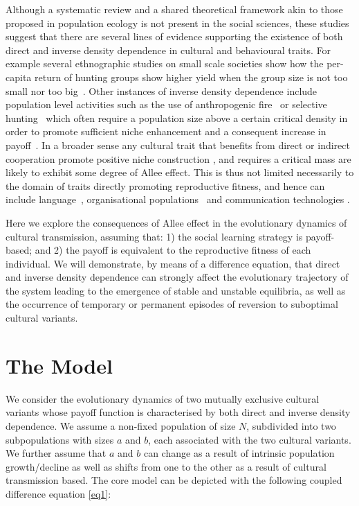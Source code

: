 \documentclass[3p,authoryear,twocolumn]{elsarticle} %
\begin{document}
Although a systematic review and a shared theoretical framework akin to those proposed in population ecology \citep{kramer_etal_2009} is not present in the social sciences, these studies suggest that there are several lines of evidence supporting the existence of both direct and inverse density dependence in cultural and behavioural traits. For example several ethnographic studies on small scale societies show how the per-capita return of hunting groups show higher yield when the group size is not too small nor too big~\citep{hill_and_hawkes_1983,janssen_and_hill_2014}. Other instances of inverse density dependence include population level activities such as the use of anthropogenic fire~\citep{bird2013} or selective hunting~\citep{dods_2002} which often require a population size above a certain critical density in order to promote sufficient niche enhancement and a consequent increase in payoff~\citep{rowley-conwy_and_layton_2011}. In a broader sense any cultural trait that benefits from direct or indirect cooperation %
promote positive niche construction \citep{vandermeer_2008}, and requires a critical mass \citep{rogers_2003} are likely to exhibit some degree of Allee effect. This is thus not limited necessarily to the domain of traits directly promoting reproductive fitness, and hence can include language~\citep{kandler2009}, organisational populations~\citep{caroll_and_hannan_1989} and communication technologies \citep{van_slyke_perceived_2007}.

Here we explore the consequences of Allee effect in the evolutionary dynamics of cultural transmission, assuming that: 1) the social learning strategy is payoff-based; and 2)  the payoff is equivalent to the reproductive fitness of each individual. We will demonstrate, by means of a difference equation, that direct and inverse density dependence can strongly affect the evolutionary trajectory of the system leading to the emergence of stable and unstable equilibria, as well as the occurrence of temporary or permanent episodes of reversion to suboptimal cultural variants. 

\section{The Model}
We consider the evolutionary dynamics of two mutually exclusive cultural variants whose payoff function is characterised by both direct and inverse density dependence. We assume a non-fixed population of size $N$, subdivided into two subpopulations with sizes $a$ and $b$, each associated with the two cultural variants. We further assume that $a$ and $b$ can change as a result of intrinsic population growth/decline as well as shifts from one to the other as a result of cultural transmission based. The core model can be depicted with the following coupled difference equation \eqref{eq1}:
\end{document}
